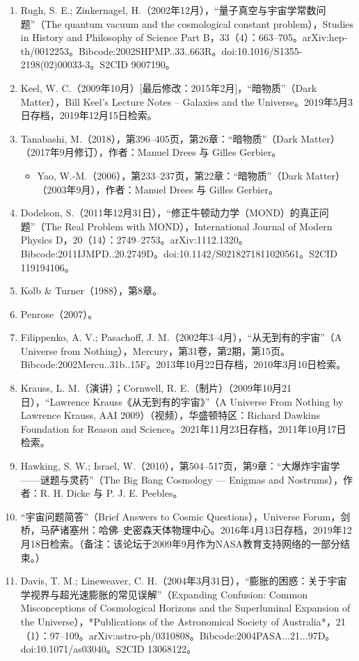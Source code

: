 \begin{enumerate}
\begin{itemize}
\end{itemize}
\item Rugh, S. E.; Zinkernagel, H.（2002年12月），“量子真空与宇宙学常数问题”（The quantum vacuum and the cosmological constant problem），Studies in History and Philosophy of Science Part B，33（4）：663–705。arXiv:hep-th/0012253。Bibcode:2002SHPMP..33..663R。doi:10.1016/S1355-2198(02)00033-3。S2CID 9007190。  
\item Keel, W. C.（2009年10月）[最后修改：2015年2月]，“暗物质”（Dark Matter），Bill Keel’s Lecture Notes – Galaxies and the Universe。2019年5月3日存档，2019年12月15日检索。  
\item Tanabashi, M.（2018），第396–405页，第26章：“暗物质”（Dark Matter）（2017年9月修订），作者：Manuel Drees 与 Gilles Gerbier。  
\begin{itemize}
\item Yao, W.-M.（2006），第233–237页，第22章：“暗物质”（Dark Matter）（2003年9月），作者：Manuel Drees 与 Gilles Gerbier。
\end{itemize}
\item Dodelson, S.（2011年12月31日），“修正牛顿动力学（MOND）的真正问题”（The Real Problem with MOND），International Journal of Modern Physics D，20（14）：2749–2753。arXiv:1112.1320。Bibcode:2011IJMPD..20.2749D。doi:10.1142/S0218271811020561。S2CID 119194106。  
\item Kolb & Turner（1988），第8章。  
\item Penrose（2007）。  
\item Filippenko, A. V.; Pasachoff, J. M.（2002年3–4月），“从无到有的宇宙”（A Universe from Nothing），Mercury，第31卷，第2期，第15页。Bibcode:2002Mercu..31b..15F。2013年10月22日存档，2010年3月10日检索。  
\item Krauss, L. M.（演讲）；Cornwell, R. E.（制片）（2009年10月21日），“Lawrence Krauss《从无到有的宇宙》”（A Universe From Nothing by Lawrence Krauss, AAI 2009）（视频），华盛顿特区：Richard Dawkins Foundation for Reason and Science。2021年11月23日存档，2011年10月17日检索。  
\item Hawking, S. W.; Israel, W.（2010），第504–517页，第9章：“大爆炸宇宙学——谜题与灵药”（The Big Bang Cosmology — Enigmas and Nostrums），作者：R. H. Dicke 与 P. J. E. Peebles。  
\item “宇宙问题简答”（Brief Answers to Cosmic Questions），Universe Forum，剑桥，马萨诸塞州：哈佛–史密森天体物理中心。2016年4月13日存档，2019年12月18日检索。（备注：该论坛于2009年9月作为NASA教育支持网络的一部分结束。）  
\item Davis, T. M.; Lineweaver, C. H.（2004年3月31日），“膨胀的困惑：关于宇宙学视界与超光速膨胀的常见误解”（Expanding Confusion: Common Misconceptions of Cosmological Horizons and the Superluminal Expansion of the Universe），*Publications of the Astronomical Society of Australia*，21（1）：97–109。arXiv:astro-ph/0310808。Bibcode:2004PASA...21...97D。doi:10.1071/as03040。S2CID 13068122。  

\end{enumerate}
